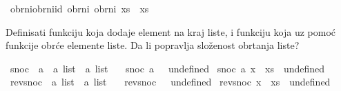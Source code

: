 \begin{isabellebody}
\begin{exercise}[subtitle=Algebarski tip podataka: lista.]
%
\isatagproof
%
\endisatagproof
{\isafoldproof}%
%
\isadelimproof
%
\endisadelimproof
\isanewline
{}\isamarkupfalse%
\ obrni{\isacharunderscore}{\kern0pt}obrni{\isacharunderscore}{\kern0pt}id{\isacharcolon}{\kern0pt}\ {\isachardoublequoteopen}obrni\ {\isacharparenleft}{\kern0pt}obrni\ xs{\isacharparenright}{\kern0pt}\ {\isacharequal}{\kern0pt}\ xs{\isachardoublequoteclose}\isanewline
\ \ %
\isadelimproof
%
\endisadelimproof
%
\isatagproof
%
\endisatagproof
{\isafoldproof}%
%
\isadelimproof
%
\endisadelimproof
%
\begin{isamarkuptext}%
Definisati funkciju  koja dodaje element 
      na kraj liste, i funkciju  koja uz pomoć 
      funkcije  obrće elemente liste. Da li  popravlja složenost
      obrtanja liste?%
\end{isamarkuptext}\isamarkuptrue%
\isamarkupfalse%
\ snoc\ {\isacharcolon}{\kern0pt}{\isacharcolon}{\kern0pt}\ {\isachardoublequoteopen}{\isacharprime}{\kern0pt}a\ {\isasymRightarrow}\ {\isacharprime}{\kern0pt}a\ list\ {\isasymRightarrow}\ {\isacharprime}{\kern0pt}a\ list{\isachardoublequoteclose}\ \isanewline
\ \ {\isachardoublequoteopen}snoc\ a\ {\isacharbrackleft}{\kern0pt}{\isacharbrackright}{\kern0pt}\ {\isacharequal}{\kern0pt}\ undefined{\isachardoublequoteclose}\isanewline
{\isacharbar}{\kern0pt}\ {\isachardoublequoteopen}snoc\ a\ {\isacharparenleft}{\kern0pt}x\ {\isacharhash}{\kern0pt}\ xs{\isacharparenright}{\kern0pt}\ {\isacharequal}{\kern0pt}\ undefined{\isachardoublequoteclose}\isanewline
\isanewline
{}\isamarkupfalse%
\ rev{\isacharunderscore}{\kern0pt}snoc\ {\isacharcolon}{\kern0pt}{\isacharcolon}{\kern0pt}\ {\isachardoublequoteopen}{\isacharprime}{\kern0pt}a\ list\ {\isasymRightarrow}\ {\isacharprime}{\kern0pt}a\ list{\isachardoublequoteclose}\ \isanewline
\ \ {\isachardoublequoteopen}rev{\isacharunderscore}{\kern0pt}snoc\ {\isacharbrackleft}{\kern0pt}{\isacharbrackright}{\kern0pt}\ {\isacharequal}{\kern0pt}\ undefined{\isachardoublequoteclose}\isanewline
{\isacharbar}{\kern0pt}\ {\isachardoublequoteopen}rev{\isacharunderscore}{\kern0pt}snoc\ {\isacharparenleft}{\kern0pt}x\ {\isacharhash}{\kern0pt}\ xs{\isacharparenright}{\kern0pt}\ {\isacharequal}{\kern0pt}\ undefined{\isachardoublequoteclose}%

\end{exercise}
\end{isabellebody}
